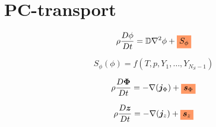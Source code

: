 \documentclass[20pt,twocolumn]{article}
\newcommand{\highlight}[1]{%
  \colorbox{pink-orange}{$\displaystyle#1$}}
\begin{document}

\vspace{10mm}

\setlength{\parindent}{0cm}

\renewcommand{\familydefault}{\sfdefault}

\LARGE

\section{PC-transport}

\begin{equation*}
\rho \frac{D \phi}{Dt} = \mathbb{D} \nabla^2 \phi + \highlight{S_{\phi}}
\end{equation*}

\begin{equation*}
S_{\phi}(\phi) = f(T, p, Y_1, \dots, Y_{N_S - 1})
\end{equation*}

\begin{equation*}
\rho \frac{D \bm{\Phi}}{Dt} = - \nabla (\bm{j}_{\Phi}) + \highlight{\bm{s}_{\Phi}}
\end{equation*}

\begin{equation*}
\rho \frac{D \bm{z}}{Dt} = - \nabla (\bm{j}_{z}) + \highlight{\bm{s}_{z}}
\end{equation*}
\end{document}
